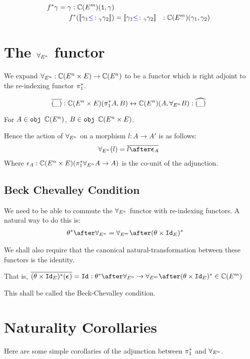 \begin{align*}
    f^*{\gamma} = \gamma: \mathbb{C}(E^m)(\texttt{1}, \gamma)\\
    f^*({\bf [\![}\gamma_1 {\color{blue} \leq\colon}_\gamma \gamma_2{\bf ]\!]}) & = {\bf [\![}\gamma_1 {\color{blue} \leq\colon}_\gamma \gamma_2{\bf ]\!]} &: \mathbb{C}(E^m)(\gamma_1, \gamma_2)\\
\end{align*}

\section{The $\forall_{E^n}$ functor}

We expand $\forall_{E^n}: \mathbb{C}(E^n\times E) \rightarrow \mathbb{C}(E^n)$ to be a functor which is right adjoint to the re-indexing functor $\pi_1^*$.

\begin{equation}
    \bar{(\_)}: \C(E^n\times E)(\pstar A, B) \leftrightarrow \C(E^n)(A, \allEn B) : \widehat{(\_)}
\end{equation}

For $A\in\texttt{obj }\mathbb{C}(E^n)$, $B\in\texttt{obj }\mathbb{C}(E^n\times E)$.

Hence the action of $\forall_{E^n}$ on a morphism $l : A\rightarrow A'$ is as follows:
\begin{eqnarray}
    \allEn(l) = \bar{l\after\counit{A}}
\end{eqnarray}
Where $\epsilon_A: \mathbb{C}(E^n\times E)(\pi_1^*\forall_{E^n} A \rightarrow A)$ is the co-unit of the adjunction.

\subsection{Beck Chevalley Condition}
We need to be able to commute the $\forall_{E^n}$ functor with re-indexing functors. A natural way to do this is:
\begin{align*}
    \theta\star\after\allEn & = \allEm\after(\theta\times\Id{E})\star
\end{align*}

We shall also require that the canonical natural-transformation between these functors is the identity.

That is, $\bar{(\theta\times\Id{E})\star(\counit{})} = \Id{}: \theta\star\after\allEn \rightarrow \allEm\after(\theta\times\Id{E})\star\in \C(E^m)$

This shall be called the Beck-Chevalley condition.


\section{Naturality Corollaries}
Here are some simple corollaries of the adjunction between $\pi_1^*$ and $\forall_{E^n}$.
    
